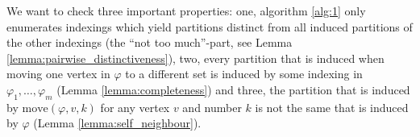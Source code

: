 \documentclass[11pt,a4paper]{article}
\numberwithin{equation}{section}
\newcommand{\idx}{\varphi}
\newcommand{\move}{\mathrm{move}}
\begin{document}
We want to check three important properties: one, algorithm \ref{alg:1} only enumerates indexings which yield partitions distinct from all induced partitions of the other indexings (the ``not too much''-part, see Lemma \ref{lemma:pairwise_distinctiveness}), two, every partition that is induced when moving one vertex in $\idx$ to a different set is induced by some indexing in $\idx_1,\dots,\idx_m$ (Lemma \ref{lemma:completeness}) and three, the partition that is induced by $\move(\idx,v,k)$ for any vertex $v$ and number $k$ is not the same that is induced by $\idx$ (Lemma \ref{lemma:self_neighbour}).

\end{document}
